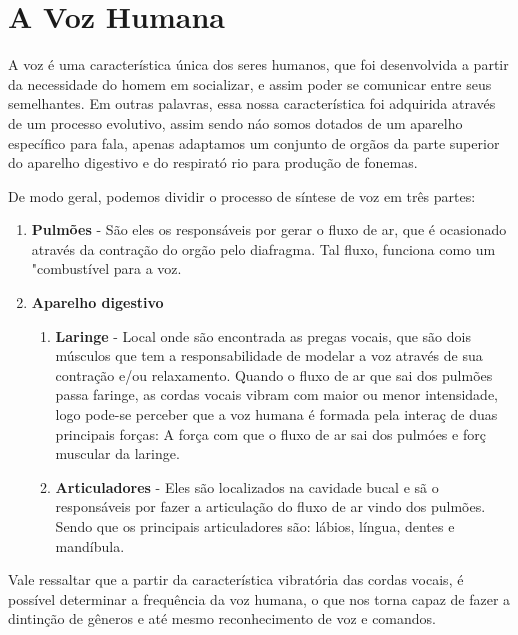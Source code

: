 \documentclass[a4paper,12pt,twoside,openright]{report}
\begin{document}
\section{A Voz Humana}
\label{voz_humana}
\par A voz \'{e} uma caracter\'{i}stica \'{u}nica dos seres humanos, que foi desenvolvida a partir da necessidade do homem em socializar, e assim poder se comunicar entre seus semelhantes. Em outras palavras, essa nossa caracter\'{i}stica foi adquirida atrav\'{e}s de um processo evolutivo, assim sendo n\'{a}o somos dotados de um aparelho espec\'{i}fico para fala, apenas adaptamos um conjunto de org\~{a}os da parte superior do aparelho digestivo e do respirat\'{o} rio para produ{\c c}\~{a}o de fonemas.

\par De modo geral, podemos dividir o processo de s\'{i}ntese de voz em tr\^{e}s partes: 

\begin{enumerate}
	\item \textbf{Pulm\~{o}es} - S\~{a}o eles os respons\'{a}veis por gerar o fluxo de ar, que \'{e} ocasionado atrav\'{e}s da contra{\c c}\~{a}o do org\~{a}o pelo diafragma. Tal fluxo, funciona como um "combust\'{i}vel para a voz.
	\item \textbf{Aparelho digestivo} 
	\begin{enumerate}
		\item{} \textbf{Laringe} - Local onde s\~{a}o encontrada as pregas vocais, que s\~{a}o dois m\'{u}sculos que tem a responsabilidade de modelar a voz atrav\'{e}s de sua contra{\c c}\~{a}o e/ou relaxamento. Quando o fluxo de ar que sai dos pulm\~{o}es passa faringe, as cordas vocais vibram com maior ou menor intensidade, logo pode-se perceber que a voz humana \'{e} formada pela intera{\c c} de duas principais for{\c c}as: A for{\c c}a com que o fluxo de ar sai dos pulm\'{o}es e for{\c c} muscular da laringe.
		\item{} \textbf{Articuladores} - Eles s\~{a}o localizados na cavidade bucal e s\~{a} o respons\'{a}veis por fazer a articula{\c c}\~{a}o do fluxo de ar vindo dos pulm\~{o}es. Sendo que os principais articuladores s\~{a}o: l\'{a}bios, l\'{i}ngua, dentes e mand\'{i}bula.
	\end{enumerate}
\end{enumerate}

\par Vale ressaltar que a partir da caracter\'{i}stica vibrat\'{o}ria das cordas vocais, \'{e} poss\'{i}vel determinar a frequ\^{e}ncia da voz humana, o que nos torna capaz de fazer a dintin{\c c}\~{a}o de g\^{e}neros e at\'{e} mesmo reconhecimento de voz e comandos.
\end{document}

